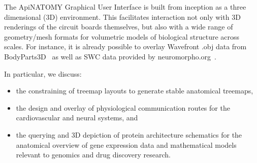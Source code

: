The ApiNATOMY Graphical User Interface is built from inception as a three dimensional (3D) environment. This facilitates interaction not only with 3D renderings of the circuit boards themselves, but also with a wide range of geometry/mesh formats for volumetric models of biological structure across scales. For instance, it is already possible to overlay Wavefront .obj data from BodyParts3D~\cite{MFT+09} as well as SWC data provided by neuromorpho.org~\cite{Asc06}.

In particular, we discuss:
\begin{itemize}
  \item the constraining of treemap layouts to generate stable anatomical treemaps,
  \item the design and overlay of physiological communication routes for the cardiovascular and neural systems, and
  \item the querying and 3D depiction of protein architecture schematics for the anatomical overview of gene expression data and mathematical models relevant to genomics and drug discovery research.
\end{itemize}

